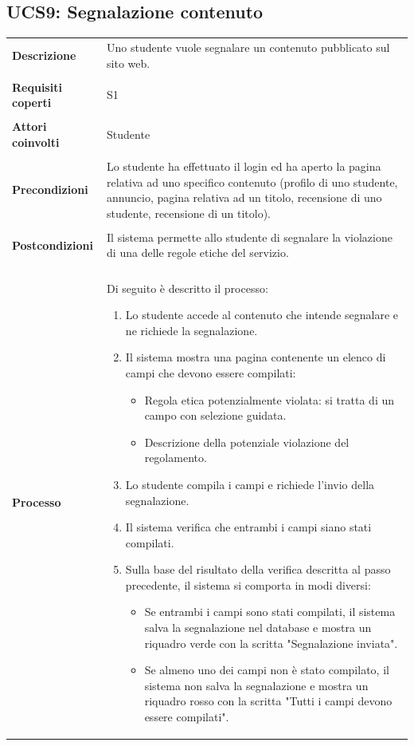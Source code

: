 \documentclass[10pt,a4paper]{report}
\begin{document}
	\subsection{UCS9: Segnalazione contenuto}
	\begin{tabular}{lp{}}
		\textbf{Descrizione}&Uno studente vuole segnalare un contenuto pubblicato sul sito web.\\
		\\
		\textbf{Requisiti coperti}&S1\\
		\\
		\textbf{Attori coinvolti}&Studente\\
		\\
		\textbf{Precondizioni}&Lo studente ha effettuato il login ed ha aperto la pagina relativa ad uno specifico contenuto (profilo di uno studente, annuncio, pagina relativa ad un titolo, recensione di uno studente, recensione di un titolo).\\
		\\
		\textbf{Postcondizioni}&Il sistema permette allo studente di segnalare la violazione di una delle regole etiche del servizio.\\
		\\
		\textbf{Processo}&Di seguito è descritto il processo:
		\begin{enumerate}
			\item Lo studente accede al contenuto che intende segnalare e ne richiede la segnalazione.
			\item Il sistema mostra una pagina contenente un elenco di campi che devono essere compilati:
			\begin{itemize}
				\item Regola etica potenzialmente violata: si tratta di un campo con selezione guidata.
				\item Descrizione della potenziale violazione del regolamento.
			\end{itemize}
			\item Lo studente compila i campi e richiede l'invio della segnalazione.
			\item Il sistema verifica che entrambi i campi siano stati compilati.
			\item Sulla base del risultato della verifica descritta al passo precedente, il sistema si comporta in modi diversi:
			\begin{itemize}
				\item Se entrambi i campi sono stati compilati, il sistema salva la segnalazione nel database e mostra un riquadro verde con la scritta "Segnalazione inviata".
				\item Se almeno uno dei campi non è stato compilato, il sistema non salva la segnalazione e mostra un riquadro rosso con la scritta "Tutti i campi devono essere compilati".
			\end{itemize}
		\end{enumerate}
	\end{tabular}
\end{document}
